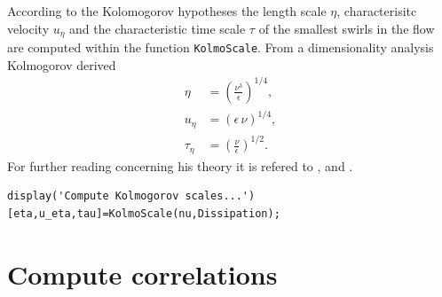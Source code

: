 \documentclass[preprint,12pt,ntfdMod]{elsarticle}
\begin{document}
\begin{par}

According to the Kolomogorov hypotheses the length scale $\eta$,
characterisitc velocity $u_{\eta}$ and the characteristic time scale
$\tau$ of the smallest swirls in the flow are computed
within the function \lstinline!KolmoScale!. From a dimensionality
analysis Kolmogorov derived
  \begin{eqnarray}
      \eta&=\displaystyle\left(\frac{\nu^3}{\epsilon}\right)^{1/4},\\
      u_{\eta}&=\left(\epsilon\,\nu\right)^{1/4},\\
      \tau_{\eta}&=\displaystyle\left(\frac{\nu}{\epsilon}\right)^{1/2}.
  \end{eqnarray}
For further reading concerning his theory it is refered to
\citet{Pope:2000tp}, \citet{Hinze:1975tb} and \citet{Tennekes:1972vb}.

\end{par} \vspace{1em}
\begin{verbatim}
display('Compute Kolmogorov scales...')
[eta,u_eta,tau]=KolmoScale(nu,Dissipation);
\end{verbatim}
\begin{par}



\end{par} \vspace{1em}


\section{Compute correlations}
\end{document}
